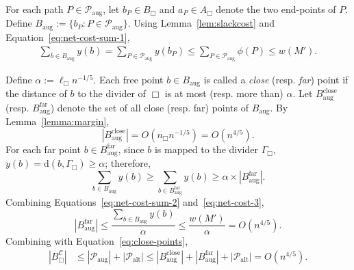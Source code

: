 \documentclass[11pt,onecolumn]{article}
\def\mcC{{\mathcal{C}}}
\def\mcP{{\mathcal{P}}}
\newcommand{\cell}{\Box}
\newcommand{\distance}[2]{\mathrm{d}(#1, #2)}
\newcommand{\divider}[1]{\Gamma_{#1}}
\begin{document}
For each path $P\in \mcP_{\mathrm{aug}}$, let $b_P\in B_\cell$ and $a_P\in A_\cell$ denote the two end-points of $P$. Define $B_{\mathrm{aug}}:=\{b_P:P\in \mcP_{\mathrm{aug}}\}$.  Using Lemma~\ref{lem:slackcost} and Equation~\eqref{eq:net-cost-sum-1}, 
\begin{align}
    \sum_{b\in B_{\mathrm{aug}}} y(b) = \sum_{P\in \mcP_{\mathrm{aug}}} y(b_P)\le \sum_{P\in \mcP_{\mathrm{aug}}} \phi(P) \le w(M') .\label{eq:net-cost-sum-2}
\end{align}

Define $\alpha:=\ell_\cell n^{-1/5}$. Each free point $b\in B_{\mathrm{aug}}$ is called a \emph{close} (resp. \emph{far}) point if the distance of $b$ to the divider of $\cell$ is at most (resp. more than) $\alpha$. Let $B_{\mathrm{aug}}^{\mathrm{close}}$ (resp. $B_{\mathrm{aug}}^{\mathrm{far}}$) denote the set of all close (resp. far) points of $B_{\mathrm{aug}}$. By Lemma~\ref{lemma:margin},
\begin{equation}\label{eq:close-points}
    |B_{\mathrm{aug}}^{\mathrm{close}}| = O(n_\cell n^{-1/5}) = O(n^{4/5}).
\end{equation}
For each far point $b\in B_{\mathrm{aug}}^{\mathrm{far}}$, since $b$ is mapped to the divider $\divider\cell$, $y(b)=\distance{b}{\divider\cell}\ge \alpha$; therefore, 
\begin{equation}\label{eq:net-cost-3}
    \sum_{b\in B_{\mathrm{aug}}} y(b) \ge \sum_{b\in B_{\mathrm{aug}}^{\mathrm{far}}} y(b) \ge \alpha\times |B_{\mathrm{aug}}^{\mathrm{far}}|.
\end{equation}
Combining Equations~\eqref{eq:net-cost-sum-2} and~\eqref{eq:net-cost-3},
\begin{equation}\label{eq:far-points}
    |B_{\mathrm{aug}}^{\mathrm{far}}| \le \frac{\sum_{b\in B_{\mathrm{aug}}} y(b)}{\alpha} \le \frac{w(M')}{\alpha} = O(n^{4/5}).
\end{equation}
Combining with Equation~\eqref{eq:close-points},
\begin{align*}
    |B_\cell^\mcC| &\le |\mcP_{\mathrm{aug}}| + |\mcP_{\mathrm{alt}}| \le |B_{\mathrm{aug}}^{\mathrm{close}}| + |B_{\mathrm{aug}}^{\mathrm{far}}| + |\mcP_{\mathrm{alt}}| = O(n^{4/5}).
\end{align*}



%

%
%
%

%



%

%
%
%
%
%
%
%
%
%
\end{document}
